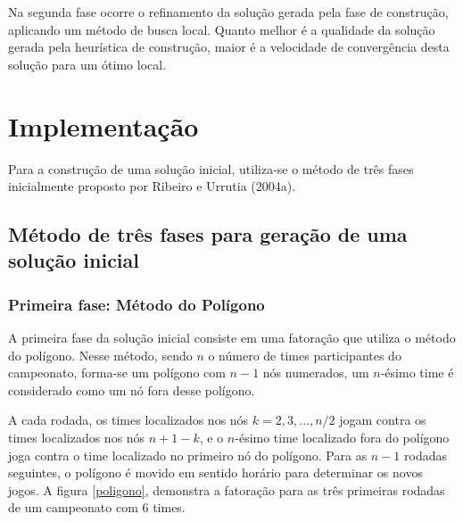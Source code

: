 \documentclass[12pt,a4paper]{article}
\begin{document}

Na segunda fase ocorre o refinamento da solução gerada pela fase de construção, aplicando um método de busca local. Quanto melhor é a qualidade da solução gerada pela heurística de construção, maior é a velocidade de convergência desta solução para um ótimo local.


\section{Implementação}

Para a construção de uma solução inicial, utiliza-se o método de três fases inicialmente proposto por Ribeiro e Urrutia (2004a)\cite{urrutia:heuristics}.

\subsection{Método de três fases para geração de uma solução inicial}

\subsubsection{Primeira fase: Método do Polígono}

A primeira fase da solução inicial consiste em uma fatoração que utiliza o método do polígono. Nesse método, sendo $n$ o número de times participantes do campeonato, forma-se um polígono com $n-1$ nós numerados, um $n$-ésimo time é considerado como um nó fora desse polígono.

A cada rodada, os times localizados nos nós $k=2,3,...,n/2$ jogam contra os times localizados nos nós $n+1-k$, e o $n$-ésimo time localizado fora do polígono joga contra o time localizado no primeiro nó do polígono. Para as $n-1$ rodadas seguintes, o polígono é movido em sentido horário para determinar os novos jogos. A figura \ref{poligono}, demonstra a fatoração para as três primeiras rodadas de um campeonato com 6 times.
\end{document}
